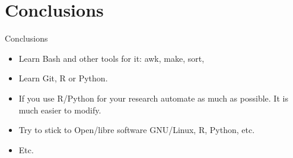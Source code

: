\documentclass{beamer}
\begin{document}


\section{Conclusions}

\begin{frame}{Conclusions} %

\begin{itemize}
  \item Learn Bash and other tools for it: awk, make, sort, 
  \item Learn  Git, R or Python.
  \item If you use R/Python for your research automate as much as possible. It is much easier to modify.
  \item Try to stick to Open/libre software GNU/Linux, R, Python, etc.
  \item Etc.
\end{itemize}

\end{frame}
\end{document}
